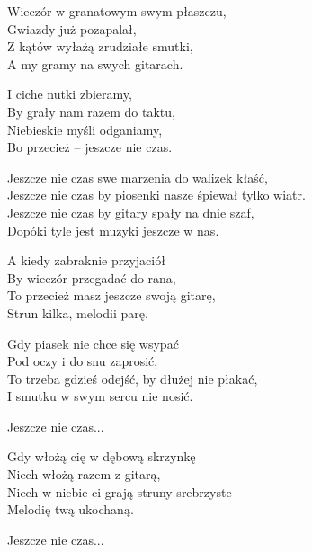 \begin{text}
    Wieczór w granatowym swym płaszczu,\\
    Gwiazdy już pozapalał,\\
    Z kątów wyłażą zrudziałe smutki,\\
    A my gramy na swych gitarach.

    I ciche nutki zbieramy,\\
    By grały nam razem do taktu,\\
    Niebieskie myśli odganiamy,\\
    Bo przecież – jeszcze nie czas.
    
    \hfill\break
    \vin Jeszcze nie czas swe marzenia do walizek kłaść,\\
    \vin Jeszcze nie czas by piosenki nasze śpiewał tylko wiatr.\\
    \vin Jeszcze nie czas by gitary spały na dnie szaf,\\
    \vin Dopóki tyle jest muzyki jeszcze w nas.

    A kiedy zabraknie przyjaciół\\
    By wieczór przegadać do rana,\\
    To przecież masz jeszcze swoją gitarę,\\
    Strun kilka, melodii parę.

    Gdy piasek nie chce się wsypać\\
    Pod oczy i do snu zaprosić,\\
    To trzeba gdzieś odejść, by dłużej nie płakać,\\
    I smutku w swym sercu nie nosić.

    \vin Jeszcze nie czas...

    Gdy włożą cię w dębową skrzynkę\\
    Niech włożą razem z gitarą,\\
    Niech w niebie ci grają struny srebrzyste\\
    Melodię twą ukochaną.

    \vin Jeszcze nie czas...
\end{text}
